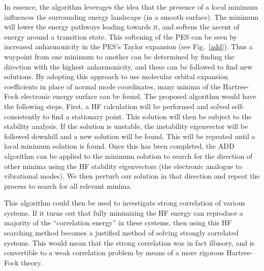 \documentclass{revtex4}
\begin{document}
    In essence, the algorithm leverages the idea that the 
    presence of a local minimum influences the surrounding energy landscape (in a smooth surface). 
    The minimum will lower the energy pathways leading towards it, and softens the ascent of energy 
    around a transition state. This softening of the PES can be seen by increased anharmonicity in 
    the PES's Taylor expansion (see Fig.~\ref{add}). Thus a waypoint from one minimum to another 
    can 
    be determined by 
    finding the direction with the highest anharmonicity, and these can be followed to find new 
    solutions. By adopting this approach to use 
    molecular orbital expansion 
    coefficients in place of normal mode coordinates, many minima of the Hartree-Fock electronic 
    energy surface can be found. The proposed algorithm would have the following steps. First, a HF 
    calculation will be performed and solved self-consistently to find a stationary point. This 
    solution will then be subject to the stability analysis. If the solution is unstable, the 
    instability eigenvector will be followed downhill and a new solution will be found. This will 
    be repeated until a local minimum solution is found. Once this has been completed, the ADD 
    algorithm can be applied to the minimum solution to search for the direction of other minima 
    using the HF stability eigenvectors (the electronic analogue to vibrational modes). We then 
    perturb our solution in that direction and repeat the process to search for all relevant 
    minima. 
    
    This algorithm could then be used to investigate strong correlation of various systems. If it 
    turns out that fully minimizing the HF energy can reproduce a majority of the ``correlation 
    energy'' in these systems, then using this HF searching method becomes a justified method of 
    solving strongly correlated systems. This would mean that the strong correlation was in fact illusory, and is convertible to a weak correlation problem by means of a more rigorous Hartree-Fock theory. 
    
\end{document}
